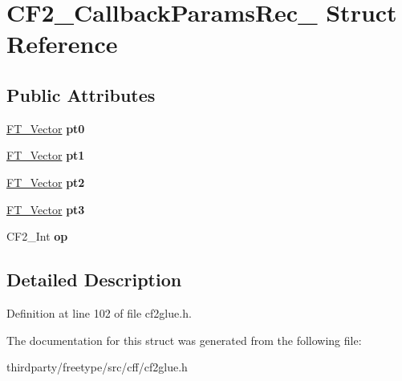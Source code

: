 \hypertarget{struct_c_f2___callback_params_rec__}{}\section{C\+F2\+\_\+\+Callback\+Params\+Rec\+\_\+ Struct Reference}
\label{struct_c_f2___callback_params_rec__}
\subsection*{Public Attributes}
\begin{DoxyCompactItemize}
\item 
\mbox{\label{struct_c_f2___callback_params_rec___a2837ac898e874600a12ad8a515675ac9}} 
\hyperlink{struct_f_t___vector__}{F\+T\+\_\+\+Vector} {\bfseries pt0}
\item 
\mbox{\label{struct_c_f2___callback_params_rec___a3174e665e945e6b738ef1f7be3be813a}} 
\hyperlink{struct_f_t___vector__}{F\+T\+\_\+\+Vector} {\bfseries pt1}
\item 
\mbox{\label{struct_c_f2___callback_params_rec___a3507cbcb8f68fa0f7c97151d2512732b}} 
\hyperlink{struct_f_t___vector__}{F\+T\+\_\+\+Vector} {\bfseries pt2}
\item 
\mbox{\label{struct_c_f2___callback_params_rec___a27b984ccac57a7d1611a4c40db8f043f}} 
\hyperlink{struct_f_t___vector__}{F\+T\+\_\+\+Vector} {\bfseries pt3}
\item 
\mbox{\label{struct_c_f2___callback_params_rec___aefcad63dd80e61f40f1089711362eed4}} 
C\+F2\+\_\+\+Int {\bfseries op}
\end{DoxyCompactItemize}


\subsection{Detailed Description}


Definition at line 102 of file cf2glue.\+h.



The documentation for this struct was generated from the following file\+:\begin{DoxyCompactItemize}
\item 
thirdparty/freetype/src/cff/cf2glue.\+h\end{DoxyCompactItemize}
